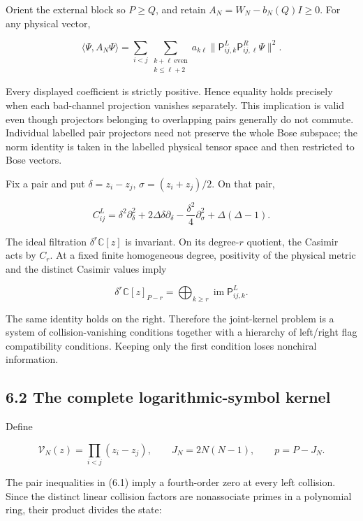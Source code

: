 Orient the external block so \(P\ge Q\), and retain \(A_N=W_N-b_N(Q)I\ge0\). For any physical vector,

\[
\langle\Psi,A_N\Psi\rangle
=\sum_{i<j}\sum_{\substack{k+\ell\ \mathrm{even}\\k\le\ell+2}}
a_{k\ell}\|\mathsf P^L_{ij,k}\mathsf P^R_{ij,\ell}\Psi\|^2.
\tag{6.1}
\]

Every displayed coefficient is strictly positive. Hence equality holds precisely when each bad-channel projection vanishes separately. This implication is valid even though projectors belonging to overlapping pairs generally do not commute. Individual labelled pair projectors need not preserve the whole Bose subspace; the norm identity is taken in the labelled physical tensor space and then restricted to Bose vectors.

Fix a pair and put \(\delta=z_i-z_j\), \(\sigma=(z_i+z_j)/2\). On that pair,

\[
C_{ij}^L=
\delta^2\partial_\delta^2+2\Delta\delta\partial_\delta
-\frac{\delta^2}{4}\partial_\sigma^2+\Delta(\Delta-1).
\tag{6.2}
\]

The ideal filtration \(\delta^r\mathbb C[z]\) is invariant. On its degree-\(r\) quotient, the Casimir acts by \(C_r\). At a fixed finite homogeneous degree, positivity of the physical metric and the distinct Casimir values imply

\[
\delta^r\mathbb C[z]_{P-r}
=\bigoplus_{k\ge r}\operatorname{im}\mathsf P^L_{ij,k}.
\tag{6.3}
\]

The same identity holds on the right. Therefore the joint-kernel problem is a system of collision-vanishing conditions together with a hierarchy of left/right flag compatibility conditions. Keeping only the first condition loses nonchiral information.

\hypertarget{the-complete-logarithmic-symbol-kernel}{%
\subsection{6.2 The complete logarithmic-symbol kernel}\label{the-complete-logarithmic-symbol-kernel}}

Define

\[
\mathcal V_N(z)=\prod_{i<j}(z_i-z_j),\qquad
J_N=2N(N-1),\qquad p=P-J_N.
\tag{6.4}
\]

The pair inequalities in (6.1) imply a fourth-order zero at every left collision. Since the distinct linear collision factors are nonassociate primes in a polynomial ring, their product divides the state:

